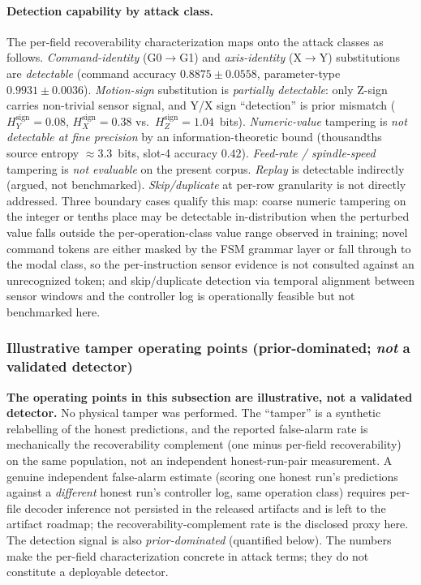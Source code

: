 \documentclass[sensors,article,submit,moreauthors,pdftex]{Definitions/mdpi}
\begin{document}
\paragraph{Detection capability by attack class.} The per-field recoverability characterization maps onto the attack classes as follows. \emph{Command-identity} (G0$\to$G1) and \emph{axis-identity} (X$\to$Y) substitutions are \emph{detectable} (command accuracy $0.8875 \pm 0.0558$, parameter-type $0.9931 \pm 0.0036$). \emph{Motion-sign} substitution is \emph{partially detectable}: only Z-sign carries non-trivial sensor signal, and Y/X sign ``detection'' is prior mismatch ($H_{Y}^{\text{sign}}\!=\!0.08$, $H_{X}^{\text{sign}}\!=\!0.38$ vs.\ $H_{Z}^{\text{sign}}\!=\!1.04$~bits). \emph{Numeric-value} tampering is \emph{not detectable at fine precision} by an information-theoretic bound (thousandths source entropy $\approx 3.3$~bits, slot-4 accuracy $0.42$). \emph{Feed-rate / spindle-speed} tampering is \emph{not evaluable} on the present corpus. \emph{Replay} is detectable indirectly (argued, not benchmarked). \emph{Skip/duplicate} at per-row granularity is not directly addressed. Three boundary cases qualify this map: coarse numeric tampering on the integer or tenths place may be detectable in-distribution when the perturbed value falls outside the per-operation-class value range observed in training; novel command tokens are either masked by the FSM grammar layer or fall through to the modal class, so the per-instruction sensor evidence is not consulted against an unrecognized token; and skip/duplicate detection via temporal alignment between sensor windows and the controller log is operationally feasible but not benchmarked here.

\subsubsection*{Illustrative tamper operating points (prior-dominated; \emph{not} a validated detector)}
\label{sec:disc-tamper-illustrative}

\noindent\textbf{The operating points in this subsection are illustrative, not a validated detector.} No physical tamper was performed. The ``tamper'' is a synthetic relabelling of the honest predictions, and the reported false-alarm rate is mechanically the recoverability complement (one minus per-field recoverability) on the same population, not an independent honest-run-pair measurement. A genuine independent false-alarm estimate (scoring one honest run's predictions against a \emph{different} honest run's controller log, same operation class) requires per-file decoder inference not persisted in the released artifacts and is left to the artifact roadmap; the recoverability-complement rate is the disclosed proxy here. The detection signal is also \emph{prior-dominated} (quantified below). The numbers make the per-field characterization concrete in attack terms; they do not constitute a deployable detector.
\end{document}

